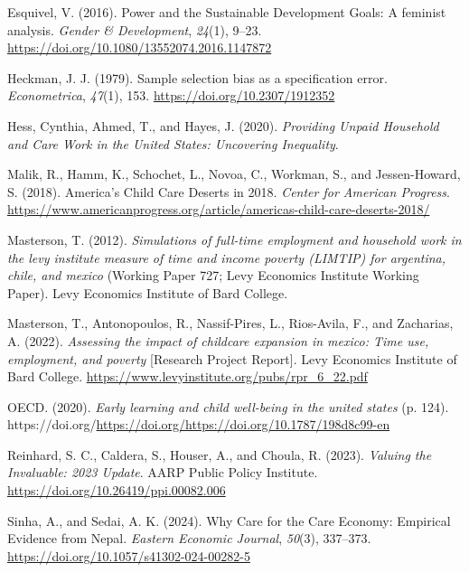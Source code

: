 \documentclass[
  11pt,
]{article}
\newlength{\cslhangindent}
\newenvironment{CSLReferences}[2] %
 {\begin{list}{}{%
  \setlength{\itemindent}{0pt}
  \setlength{\leftmargin}{0pt}
  \setlength{\parsep}{0pt}
  \ifodd #1
   \setlength{\leftmargin}{\cslhangindent}
   \setlength{\itemindent}{-1\cslhangindent}
  \fi
  \setlength{\itemsep}{#2\baselineskip}}}
 {\end{list}}
\begin{document}
\begin{CSLReferences}{1}{0}
Esquivel, V. (2016). Power and the {Sustainable} {Development} {Goals}:
A feminist analysis. \emph{Gender \& Development}, \emph{24}(1), 9--23.
\url{https://doi.org/10.1080/13552074.2016.1147872}

Heckman, J. J. (1979). Sample selection bias as a specification error.
\emph{Econometrica}, \emph{47}(1), 153.
\url{https://doi.org/10.2307/1912352}

Hess, Cynthia, Ahmed, T., and Hayes, J. (2020). \emph{Providing {Unpaid}
{Household} and {Care} {Work} in the {United} {States}: {Uncovering}
{Inequality}}.

Malik, R., Hamm, K., Schochet, L., Novoa, C., Workman, S., and
Jessen-Howard, S. (2018). America's {Child} {Care} {Deserts} in 2018.
\emph{Center for American Progress}.
\url{https://www.americanprogress.org/article/americas-child-care-deserts-2018/}

Masterson, T. (2012). \emph{Simulations of full-time employment and
household work in the levy institute measure of time and income poverty
(LIMTIP) for argentina, chile, and mexico} (Working Paper 727; Levy
Economics Institute Working Paper). Levy Economics Institute of Bard
College.

Masterson, T., Antonopoulos, R., Nassif-Pires, L., Rios-Avila, F., and
Zacharias, A. (2022). \emph{Assessing the impact of childcare expansion
in mexico: Time use, employment, and poverty} {[}Research Project
Report{]}. Levy Economics Institute of Bard College.
\url{https://www.levyinstitute.org/pubs/rpr_6_22.pdf}

OECD. (2020). \emph{Early learning and child well-being in the united
states} (p. 124).
https://doi.org/\url{https://doi.org/https://doi.org/10.1787/198d8c99-en}

Reinhard, S. C., Caldera, S., Houser, A., and Choula, R. (2023).
\emph{Valuing the {Invaluable}: 2023 {Update}}. AARP Public Policy
Institute. \url{https://doi.org/10.26419/ppi.00082.006}

Sinha, A., and Sedai, A. K. (2024). Why {Care} for the {Care} {Economy}:
{Empirical} {Evidence} from {Nepal}. \emph{Eastern Economic Journal},
\emph{50}(3), 337--373. \url{https://doi.org/10.1057/s41302-024-00282-5}


\end{CSLReferences}
\end{document}
